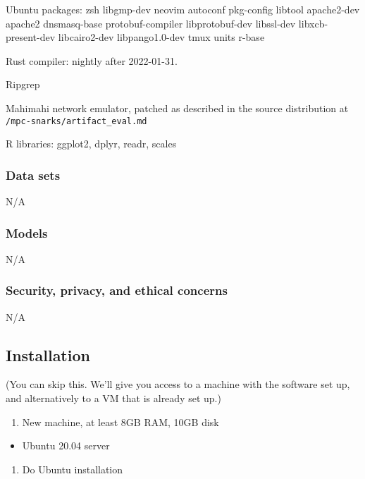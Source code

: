 \documentclass[letterpaper,twocolumn,10pt]{article}
\providecommand{\tightlist}{%
  \setlength{\itemsep}{0pt}\setlength{\parskip}{0pt}}
\begin{document}
{Ubuntu packages: zsh libgmp-dev neovim autoconf pkg-config libtool apache2-dev
apache2 dnsmasq-base protobuf-compiler libprotobuf-dev libssl-dev
libxcb-present-dev libcairo2-dev libpango1.0-dev tmux units r-base

Rust compiler: nightly after 2022-01-31.

Ripgrep

Mahimahi network emulator, patched as described in the source distribution at
\texttt{/mpc-snarks/artifact\_eval.md}

R libraries: ggplot2, dplyr, readr, scales

\subsubsection{Data sets}

N/A

\subsubsection{Models}
N/A

\subsubsection{Security, privacy, and ethical concerns}
N/A

\subsection{Installation}

(You can skip this. We'll give you access to a machine with the software set up,
and alternatively to a VM that is already set up.)

\begin{enumerate}
\def\labelenumi{\arabic{enumi}.}
\tightlist
\item
  New machine, at least 8GB RAM, 10GB disk
\end{enumerate}

\begin{itemize}
\tightlist
\item
  Ubuntu 20.04 server
\end{itemize}

\begin{enumerate}
\def\labelenumi{\arabic{enumi}.}
\setcounter{enumi}{1}
\tightlist
\item
  Do Ubuntu installation
\end{enumerate}

}
\end{document}
